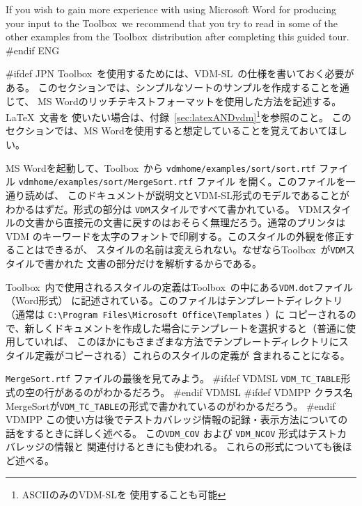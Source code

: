 \documentclass[\pformat,12pt]{article}
\newcommand{\vdmslpp}{VDM-SL}
\newcommand{\Toolbox}{Toolbox}
\newcommand{\vdmhome}{vdmhome}
\newcommand{\vdmslpp}{VDM++}
\newcommand{\Toolbox}{Toolbox}
\newcommand{\vdmhome}{vpphome}
\begin{document}
If you wish to gain more experience with using Microsoft Word for
producing your input to the \Toolbox\ we recommend that you try to
read in some of the other examples from the \Toolbox\ distribution
after completing this guided tour.
#endif ENG

#ifdef JPN
\Toolbox\ を使用するためには、\vdmslpp\ の仕様を書いておく必要がある。
このセクションでは、シンプルなソートのサンプルを作成することを通じて、
MS Wordのリッチテキストフォーマットを使用した方法を記述する。\LaTeX\ 文書を
使いたい場合は、付録~\ref{sec:latexANDvdm}\footnote{ASCIIのみの\vdmslpp を
使用することも可能}を参照のこと。
このセクションでは、MS Wordを使用すると想定していることを覚えておいてほしい。

MS Wordを起動して、\Toolbox\ から
{
{\tt \vdmhome/examples/sort/sort.rtf}
  ファイル
}
{
{\tt \vdmhome/examples/sort/MergeSort.rtf} ファイル
}を開く。このファイルを一通り読めば、
このドキュメントが説明文と\vdmslpp 形式のモデルであることがわかるはずだ。形式の部分は
\texttt{VDM}スタイルですべて書かれている。
VDMスタイルの文書から直接元の文書に戻すのはおそらく無理だろう。通常のプリンタはVDM
のキーワードを太字のフォントで印刷する。このスタイルの外観を修正することはできるが、
スタイルの名前は変えられない。なぜなら\Toolbox\ が\texttt{VDM}スタイルで書かれた
文書の部分だけを解析するからである。

\Toolbox\ 内で使用されるスタイルの定義は\Toolbox\ の中にある{\tt VDM.dot}ファイル（Word形式）
に記述されている。このファイルはテンプレートディレクトリ（通常は
\verb+C:\Program Files\Microsoft Office\Templates+ ）に
コピーされるので、新しくドキュメントを作成した場合にテンプレートを選択すると（普通に使用していれば、
このほかにもさまざまな方法でテンプレートディレクトリにスタイル定義がコピーされる）これらのスタイルの定義が
含まれることになる。

%
{{\tt MergeSort.rtf} ファイル}の最後を見てみよう。
#ifdef VDMSL
\texttt{VDM\_TC\_TABLE}形式の空の行があるのがわかるだろう。
#endif VDMSL
#ifdef VDMPP
クラス名MergeSortが\texttt{VDM\_TC\_TABLE}の形式で書かれているのがわかるだろう。
#endif VDMPP
この使い方は後でテストカバレッジ情報の記録・表示方法についての話をするときに詳しく述べる。
この\texttt{VDM\_COV} および \texttt{VDM\_NCOV} 形式はテストカバレッジの情報と
関連付けるときにも使われる。
これらの形式についても後ほど述べる。
\end{document}
